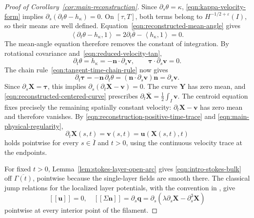 \documentclass[11pt,reqno]{amsart}
\theoremstyle{plain}
\theoremstyle{definition}
\numberwithin{equation}{section}
\newcommand{\paren}[1]{\left(#1\right)}
\newcommand{\jump}[1]{\left[\!\left[ #1\right]\!\right]}
\newcommand{\p}{\partial}
\newcommand{\bm}[1]{\boldsymbol{#1}}
\newcommand{\dual}[2]{\left\langle #1,#2 \right\rangle}
\begin{document}
\begin{proof}[Proof of Corollary~\ref{cor:main-reconstruction}]
Since $\p_s\theta=\kappa$, \eqref{eqn:kappa-velocity-form} implies
$\p_s(\p_t\theta-h_\kappa)=0$. On $[\tau,T]$, both terms belong to
$H^{-1/2+\varepsilon}(I)$, so their means are well defined.
Equation~\eqref{eqn:reconstructed-mean-angle} gives
\begin{equation*}
    \dual{\p_t\theta-h_\kappa}{1}
    =2\p_t\bar\theta-\dual{h_\kappa}{1}=0.
\end{equation*}
The mean-angle equation therefore removes the constant of integration.
By rotational covariance and~\eqref{eqn:reduced-velocity-tan},
\begin{equation*}
    \p_t\theta=h_\kappa=-\bm n\cdot\p_s\bm v,
    \qquad \bm\tau\cdot\p_s\bm v=0.
\end{equation*}
The chain rule~\eqref{eqn:tangent-time-chain-rule} now gives
\begin{equation*}
    \p_t\bm\tau
    =-\bm n\,\p_t\theta
    =(\bm n\cdot\p_s\bm v)\bm n
    =\p_s\bm v.
\end{equation*}
Since $\p_s\bm X=\bm\tau$, this implies
$\p_s(\p_t\bm X-\bm v)=0$. The curve $\bm Y$ has zero mean,
and \eqref{eqn:reconstructed-centered-curve} prescribes
$\p_t\overline{\bm X}=\frac12\int_I\bm v$.
The centroid equation fixes precisely the remaining spatially constant
velocity: $\p_t\bm X-\bm v$ has zero mean and therefore vanishes. By
\eqref{eqn:reconstruction-positive-time-trace} and
\eqref{eqn:main-physical-regularity},
\begin{equation}
    \p_t\bm X(s,t)=\bm v(s,t)=\bm u(\bm X(s,t),t)
\end{equation}
holds pointwise for every $s\in\overline I$ and $t>0$, using the
continuous velocity trace at the endpoints.

For fixed $t>0$, Lemma~\ref{lem:stokes-layer-open-arc} gives
\eqref{eqn:intro-stokes-bulk} off $\overline{\Gamma(t)}$, pointwise
because the single-layer fields are smooth there.
The classical jump relations for the localized layer potentials, with
the convention in
\cite[Theorem~2.1 and Appendix~A]{KuoLaiMoriRodenberg2023Tension}, give
\begin{equation}
    \jump{\bm u}=0,\quad
    \jump{\Sigma\bm n}=\p_s\bm q
        =\p_s\paren{\lambda\p_s\bm X-\p_s^3\bm X}
\end{equation}
pointwise at every interior point of the filament.


\end{proof}
\end{document}
